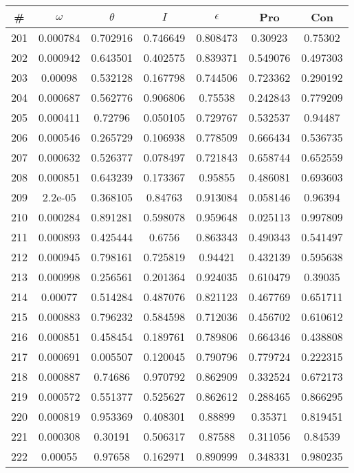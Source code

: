 \newpage
\begin{table}
\begin{tabular}{c|c|c|c|c|c|c}
\# & $\omega$ & $\theta$ & $I$ & $\epsilon$ & Pro & Con\\
\hline
201 & 0.000784 & 0.702916 & 0.746649 & 0.808473 & 0.30923 & 0.75302\\
202 & 0.000942 & 0.643501 & 0.402575 & 0.839371 & 0.549076 & 0.497303\\
203 & 0.00098 & 0.532128 & 0.167798 & 0.744506 & 0.723362 & 0.290192\\
204 & 0.000687 & 0.562776 & 0.906806 & 0.75538 & 0.242843 & 0.779209\\
205 & 0.000411 & 0.72796 & 0.050105 & 0.729767 & 0.532537 & 0.94487\\
206 & 0.000546 & 0.265729 & 0.106938 & 0.778509 & 0.666434 & 0.536735\\
207 & 0.000632 & 0.526377 & 0.078497 & 0.721843 & 0.658744 & 0.652559\\
208 & 0.000851 & 0.643239 & 0.173367 & 0.95855 & 0.486081 & 0.693603\\
209 & 2.2e-05 & 0.368105 & 0.84763 & 0.913084 & 0.058146 & 0.96394\\
210 & 0.000284 & 0.891281 & 0.598078 & 0.959648 & 0.025113 & 0.997809\\
211 & 0.000893 & 0.425444 & 0.6756 & 0.863343 & 0.490343 & 0.541497\\
212 & 0.000945 & 0.798161 & 0.725819 & 0.94421 & 0.432139 & 0.595638\\
213 & 0.000998 & 0.256561 & 0.201364 & 0.924035 & 0.610479 & 0.39035\\
214 & 0.00077 & 0.514284 & 0.487076 & 0.821123 & 0.467769 & 0.651711\\
215 & 0.000883 & 0.796232 & 0.584598 & 0.712036 & 0.456702 & 0.610612\\
216 & 0.000851 & 0.458454 & 0.189761 & 0.789806 & 0.664346 & 0.438808\\
217 & 0.000691 & 0.005507 & 0.120045 & 0.790796 & 0.779724 & 0.222315\\
218 & 0.000887 & 0.74686 & 0.970792 & 0.862909 & 0.332524 & 0.672173\\
219 & 0.000572 & 0.551377 & 0.525627 & 0.862612 & 0.288465 & 0.866295\\
220 & 0.000819 & 0.953369 & 0.408301 & 0.88899 & 0.35371 & 0.819451\\
221 & 0.000308 & 0.30191 & 0.506317 & 0.87588 & 0.311056 & 0.84539\\
222 & 0.00055 & 0.97658 & 0.162971 & 0.890999 & 0.348331 & 0.980235\\

\end{tabular}
\end{table}

